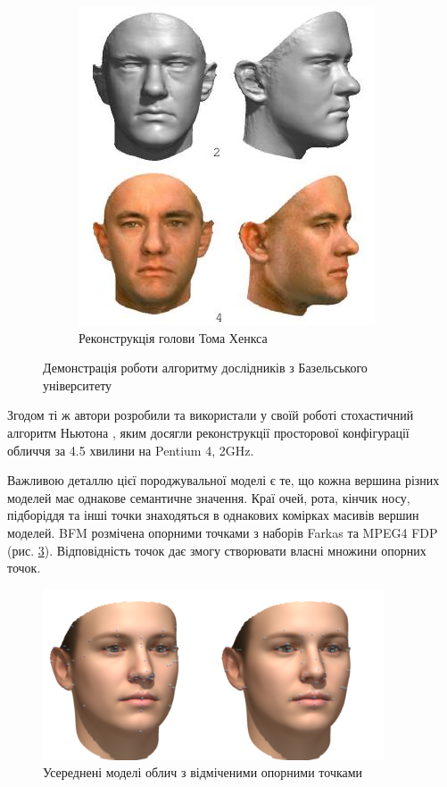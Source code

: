 \begin{figure}[h]
\begin{subfigure}[b]{0.4\textwidth}
    \includegraphics[width=\textwidth]{images/forrest-gump-model}
    \caption{Реконструкція голови Тома Хенкса}
    \label{fig:bfm:tom-hanks}
  \end{subfigure}
  \caption{Демонстрація роботи алгоритму дослідників з Базельського університету}
\end{figure}

Згодом ті ж автори розробили та використали у своїй роботі
стохастичний алгоритм Ньютона \cite{blanz:vetter:2003},
яким досягли реконструкції просторової конфігурації обличчя за 4.5 хвилини на
Pentium 4, 2GHz.

Важливою деталлю цієї породжувальної моделі є те,
що кожна вершина різних моделей має однакове семантичне значення.
Краї очей, рота, кінчик носу, підборіддя та інші точки
знаходяться в однакових комірках масивів вершин моделей.
BFM розмічена опорними точками з наборів Farkas та MPEG4 FDP
(рис. \ref{fig:problems:feature-points}).
Відповідність точок дає змогу створювати власні множини опорних точок.
\begin{figure}[h]
  \centering
  \includegraphics[width=0.9\textwidth]{images/feature-points}
  \caption{Усереднені моделі облич з відміченими опорними точками}
  \label{fig:problems:feature-points}
\end{figure}

